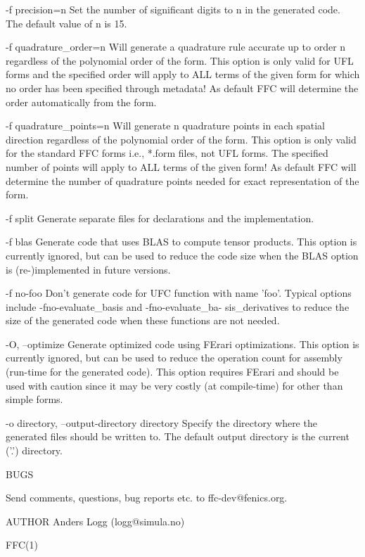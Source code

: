        -f precision=n
              Set the number of significant digits to n in the generated code.
              The default value of n is 15.

       -f quadrature_order=n
              Will generate a quadrature rule accurate up to order n regardless
              of the polynomial order of the form. This option is only valid
              for UFL forms and the specified order will apply to ALL terms of
              the given form for which no order has been specified through
              metadata! As default FFC will determine the order automatically
              from the form.

       -f quadrature_points=n
              Will generate n quadrature points in each spatial direction
              regardless of the polynomial order of the form. This option is
              only valid for the standard FFC forms i.e., *.form files, not
              UFL forms. The specified number of points will apply to ALL terms
              of the given form! As default FFC will determine the number of
              quadrature points needed for exact representation of the form.

       -f split
              Generate separate files for declarations and the implementation.

       -f blas
              Generate  code that uses BLAS to compute tensor products.  This
              option is currently ignored, but can be used to reduce the code
              size when the BLAS option is (re-)implemented in future versions.

       -f no-foo
              Don't generate code for UFC function with name 'foo'. Typical
              options   include   -fno-evaluate_basis   and  -fno-evaluate_ba-
              sis_derivatives to reduce the size  of  the generated code when
              these functions are not needed.

       -O, --optimize
              Generate optimized code using FErari optimizations. This  option
              is  currently  ignored,  but can be used to reduce the operation
              count for assembly  (run-time  for  the  generated  code).  This
              option  requires FErari and should be used with caution since it
              may be very costly  (at  compile-time)  for  other  than  simple
              forms.

       -o directory, --output-directory directory
              Specify the directory where the generated files should be written
              to. The default output directory is the current ('.') directory.

       BUGS

       Send comments, questions, bug reports etc. to ffc-dev@fenics.org.

AUTHOR
       Anders Logg (logg@simula.no)

                                                                        FFC(1)
